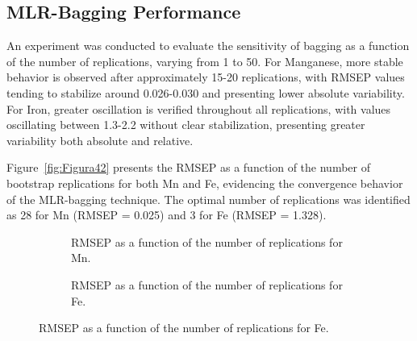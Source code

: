 \documentclass[12pt]{article}
\newcommand{\oautor}{o autor}
\begin{document}
\subsection{MLR-Bagging Performance}

An experiment was conducted to evaluate the sensitivity of bagging as a function of the number of replications, varying from 1 to 50. For Manganese, more stable behavior is observed after approximately 15-20 replications, with RMSEP values tending to stabilize around 0.026-0.030 and presenting lower absolute variability. For Iron, greater oscillation is verified throughout all replications, with values oscillating between 1.3-2.2 without clear stabilization, presenting greater variability both absolute and relative.

Figure~\ref{fig:Figura42} presents the RMSEP as a function of the number of bootstrap replications for both Mn and Fe, evidencing the convergence behavior of the MLR-bagging technique. The optimal number of replications was identified as 28 for Mn (RMSEP = 0.025) and 3 for Fe (RMSEP = 1.328).

\begin{figure}[htbp]
\centering
\caption{RMSEP as a function of the number of \textit{bootstrap} replications for MLR-\textit{bagging}.}
\label{fig:Figura42}

\begin{subfigure}{0.48\textwidth}
\centering
{}
\caption{RMSEP as a function of the number of replications for Mn.}
\label{fig:Figura42a}
\end{subfigure}
\hfill
\begin{subfigure}{0.48\textwidth}
\centering
{}
\caption{RMSEP as a function of the number of replications for Fe.}
\label{fig:Figura42b}
\end{subfigure}
\end{figure}
\end{document}
